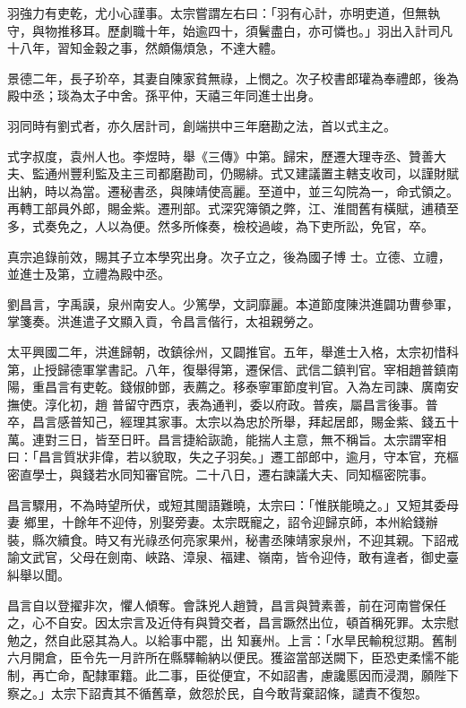 \begin{pinyinscope}
 羽強力有吏乾，尤小心謹事。太宗嘗謂左右曰：「羽有心計，亦明吏道，但無執守，與物推移耳。歷劇職十年，始逾四十，須鬢盡白，亦可憐也。」羽出入計司凡十八年，習知金穀之事，然頗傷煩急，不達大體。



 景德二年，長子玠卒，其妻自陳家貧無祿，上憫之。次子校書郎瓘為奉禮郎，後為殿中丞；琰為太子中舍。孫平仲，天禧三年同進士出身。



 羽同時有劉式者，亦久居計司，創端拱中三年磨勘之法，首以式主之。



 式字叔度，袁州人也。李煜時，舉《三傳》中第。歸宋，歷遷大理寺丞、贊善大夫、監通州豐利監及主三司都磨勘司，仍賜緋。式又建議置主轄支收司，以謹財賦出納，時以為當。遷秘書丞，與陳靖使高麗。至道中，並三勾院為一，命式領之。再轉工部員外郎，賜金紫。遷刑部。式深究簿領之弊，江、淮間舊有橫賦，逋積至多，式奏免之，人以為便。然多所條奏，檢校過峻，為下吏所訟，免官，卒。



 真宗追錄前效，賜其子立本學究出身。次子立之，後為國子博
 士。立德、立禮，並進士及第，立禮為殿中丞。



 劉昌言，字禹謨，泉州南安人。少篤學，文詞靡麗。本道節度陳洪進闢功曹參軍，掌箋奏。洪進遣子文顯入貢，令昌言偕行，太祖親勞之。



 太平興國二年，洪進歸朝，改鎮徐州，又闢推官。五年，舉進士入格，太宗初惜科第，止授歸德軍掌書記。八年，復舉得第，遷保信、武信二鎮判官。宰相趙普鎮南陽，重昌言有吏乾。錢俶帥鄧，表薦之。移泰寧軍節度判官。入為左司諫、廣南安撫使。淳化初，趙
 普留守西京，表為通判，委以府政。普疾，屬昌言後事。普卒，昌言感普知己，經理其家事。太宗以為忠於所舉，拜起居郎，賜金紫、錢五十萬。連對三日，皆至日旰。昌言捷給詼詭，能揣人主意，無不稱旨。太宗謂宰相曰：「昌言質狀非偉，若以貌取，失之子羽矣。」遷工部郎中，逾月，守本官，充樞密直學士，與錢若水同知審官院。二十八日，遷右諫議大夫、同知樞密院事。



 昌言驟用，不為時望所伏，或短其閩語難曉，太宗曰：「惟朕能曉之。」又短其委母妻
 鄉里，十餘年不迎侍，別娶旁妻。太宗既寵之，詔令迎歸京師，本州給錢辦裝，縣次續食。時又有光祿丞何亮家果州，秘書丞陳靖家泉州，不迎其親。下詔戒諭文武官，父母在劍南、峽路、漳泉、福建、嶺南，皆令迎侍，敢有違者，御史臺糾舉以聞。



 昌言自以登擢非次，懼人傾奪。會誅兇人趙贊，昌言與贊素善，前在河南嘗保任之，心不自安。因太宗言及近侍有與贊交者，昌言蹶然出位，頓首稱死罪。太宗慰勉之，然自此惡其為人。以給事中罷，出
 知襄州。上言：「水旱民輸稅愆期。舊制六月開倉，臣令先一月許所在縣驛輸納以便民。獲盜當部送闕下，臣恐吏柔懦不能制，再亡命，配隸軍籍。此二事，臣從便宜，不如詔書，慮讒慝因而浸潤，願陛下察之。」太宗下詔責其不循舊章，斂怨於民，自今敢背棄詔條，譴責不復恕。




\end{pinyinscope}
